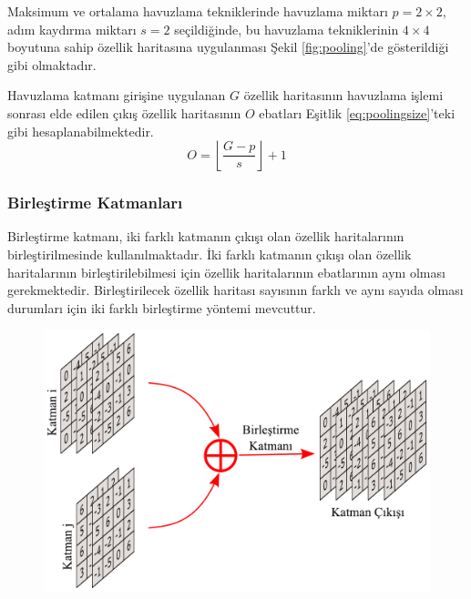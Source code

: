 Maksimum ve ortalama havuzlama tekniklerinde havuzlama miktarı $p=2 \times 2$, adım kaydırma miktarı $s=2$ seçildiğinde, bu havuzlama tekniklerinin $4 \times 4$ boyutuna sahip özellik haritasına uygulanması Şekil \ref{fig:pooling}'de gösterildiği gibi olmaktadır.

Havuzlama katmanı girişine uygulanan $G$ özellik haritasının havuzlama işlemi sonrası elde edilen çıkış özellik haritasının $O$ ebatları Eşitlik \ref{eq:poolingsize}'teki gibi hesaplanabilmektedir. 
\begin{equation}
	\label{eq:poolingsize}
	O=\left\lfloor \frac{G-p}{s} \right\rfloor+1
\end{equation}

\subsubsection{Birleştirme Katmanları}
Birleştirme katmanı, iki farklı katmanın çıkışı olan özellik haritalarının birleştirilmesinde kullanılmaktadır. İki farklı katmanın çıkışı olan özellik haritalarının birleştirilebilmesi için özellik haritalarının ebatlarının aynı olması gerekmektedir. Birleştirilecek özellik haritası sayısının farklı ve aynı sayıda olması durumları için iki farklı birleştirme yöntemi mevcuttur.

\begin{figure}[h!]
	\begin{center}
		\vspace{0.4cm}
		{
			\vspace{0.4cm}
			\includegraphics[scale=0.43]{Yapilan-Calismalar/Figures/concatenate.pdf}
		}
	\end{center}
\end{figure}

